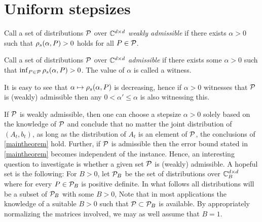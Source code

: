 \section{Uniform stepsizes}
\begin{definition}
Call a set of distributions $\P$ over $\C^{\dcd}$
\emph{weakly admissible} if there exists $\alpha>0$ such that
$\rhos{P}>0$ holds for all $P\in \P$.
\end{definition}
\begin{definition}
Call a set of distributions $\P$ over $\C^{\dcd}$ \emph{admissible}
if there exists some $\alpha>0$ such that $\inf_{P\in \P} \rhos{P}>0$.
The value of $\alpha$ is called a witness.
\end{definition}
It is easy to see that $\alpha \mapsto \rhos{P}$ is decreasing,
hence if $\alpha>0$ witnesses that $\P$ is (weakly) admissible
then any $0<\alpha'\le \alpha$ is also witnessing this.

If $\P$ is weakly admissible, then one can choose a stepsize $\alpha>0$ solely based on the knowledge of $\P$ and
conclude that no matter the joint distribution of $(A_t,b_t)$, as long as the distribution of $A_t$ is an element of $\P$, the conclusions of \cref{maintheorem} hold. Further, if $\P$ is admissible then the error bound stated in  \cref{maintheorem} becomes independent of the instance.
Hence, an interesting question to investigate is whether a given set $\P$ is (weakly) admissible.
A hopeful set is the following:
For $B>0$, let $\P_B$ be the set of distributions over $\C_B^{\dcd}$ where for every $P\in \P_B$ is positive definite.
In what follows all distributions will be a subset of $\P_B$ with some $B>0$,
Note that in most applications the knowledge of a suitable $B>0$ such that $\P\subset \P_B$ is available.
By appropriately normalizing the matrices involved, we may as well assume that $B=1$.

